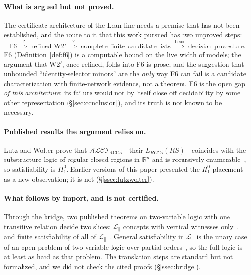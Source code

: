 \documentclass[11pt]{article}
\newcommand{\ALCIRCC}[1]{\mathcal{ALCI}_{\mathrm{RCC#1}}}
\newcommand{\reals}{\mathbb{R}}
\newcommand{\LRCC}[1]{\ensuremath{L_{\mathit{RCC#1}}}}
\theoremstyle{plain}
\theoremstyle{definition}
\begin{document}
\paragraph{What is argued but not proved.} The certificate architecture of
the Lean line needs a premise that has not been established, and the route
to it that this work pursued has two unproved steps:
\[
  \text{F6}
  \;\overset{?}{\Longrightarrow}\;
  \text{refined W2$'$}
  \;\overset{?}{\Longrightarrow}\;
  \text{complete finite candidate lists}
  \;\overset{\text{Lean}}{\Longrightarrow}\;
  \text{decision procedure}.
\]
F6 (Definition~\ref{def:f6}) is a computable bound on the live width of
models; the argument that W2$'$, once refined, folds into F6 is prose; and
the suggestion that unbounded ``identity-selector minors'' are the
\emph{only} way F6 can fail is a candidate characterization with
finite-network evidence, not a theorem. F6 is the open gap \emph{of this
architecture}: its failure would not by itself close off decidability by
some other representation (\S\ref{sec:conclusion}), and its truth is not
known to be necessary.

\paragraph{Published results the argument relies on.} Lutz and Wolter
prove that $\ALCIRCC{5}$---their $\LRCC{5}(\mathit{RS})$---coincides with
the substructure logic of regular closed regions in $\reals^n$ and is
recursively enumerable~\cite[Thms.~24, 28]{LutzWolter2006}, so
satisfiability is $\Pi^0_1$. Earlier versions of this paper presented the
$\Pi^0_1$ placement as a new observation; it is not
(\S\ref{ssec:lutzwolter}).

\paragraph{What follows by import, and is not certified.} Through the bridge,
two published theorems on two-variable logic with one transitive relation
decide two slices: $\mathcal L_{\parallel}$ concepts with vertical witnesses
only~\cite{SzwastTendera2018}, and finite satisfiability of all of
$\mathcal L_{\parallel}$~\cite{PrattHartmann2018}. General satisfiability in
$\mathcal L_{\parallel}$ is the unary case of an open problem of two-variable
logic over partial orders~\cite{MarzecTendera2026}, so the full logic is at
least as hard as that problem. The translation steps are standard but not
formalized, and we did not check the cited proofs (\S\ref{ssec:bridge}).
\end{document}
